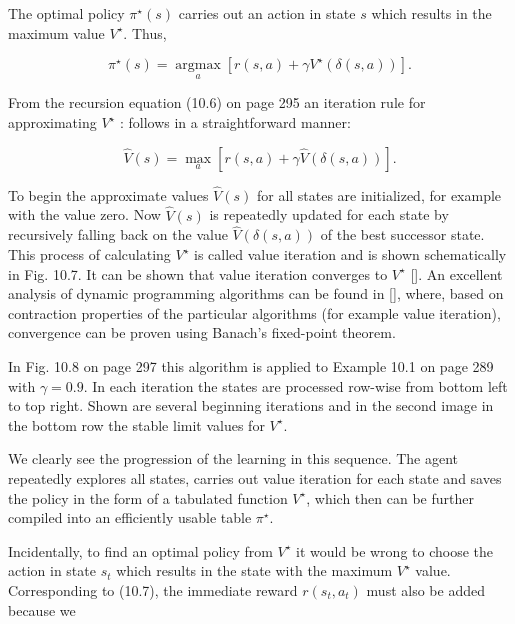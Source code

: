 \documentclass[10pt]{article}
\begin{document}
The optimal policy $\pi^{\star}(s)$ carries out an action in state $s$ which results in the maximum value $V^{\star}$. Thus,



\begin{equation*}
\pi^{\star}(s)=\underset{a}{\operatorname{argmax}}\left[r(s, a)+\gamma V^{\star}(\delta(s, a))\right] . \tag{10.7}
\end{equation*}


From the recursion equation (10.6) on page 295 an iteration rule for approximating $V^{\star}$ : follows in a straightforward manner:


\begin{equation*}
\hat{V}(s)=\max _{a}[r(s, a)+\gamma \hat{V}(\delta(s, a))] . \tag{10.8}
\end{equation*}


To begin the approximate values $\hat{V}(s)$ for all states are initialized, for example with the value zero. Now $\hat{V}(s)$ is repeatedly updated for each state by recursively falling back on the value $\hat{V}(\delta(s, a))$ of the best successor state. This process of calculating $V^{\star}$ is called value iteration and is shown schematically in Fig. 10.7. It can be shown that value iteration converges to $V^{\star}$ [\cite{sutton1998reinforcement}]. An excellent analysis of dynamic programming algorithms can be found in [\cite{szepesvari2010algorithms}], where, based on contraction properties of the particular algorithms (for example value iteration), convergence can be proven using Banach's fixed-point theorem.

In Fig. 10.8 on page 297 this algorithm is applied to Example 10.1 on page 289 with $\gamma=0.9$. In each iteration the states are processed row-wise from bottom left to top right. Shown are several beginning iterations and in the second image in the bottom row the stable limit values for $V^{\star}$.

We clearly see the progression of the learning in this sequence. The agent repeatedly explores all states, carries out value iteration for each state and saves the policy in the form of a tabulated function $V^{\star}$, which then can be further compiled into an efficiently usable table $\pi^{\star}$.

Incidentally, to find an optimal policy from $V^{\star}$ it would be wrong to choose the action in state $s_{t}$ which results in the state with the maximum $V^{\star}$ value. Corresponding to (10.7), the immediate reward $r\left(s_{t}, a_{t}\right)$ must also be added because we
\end{document}
